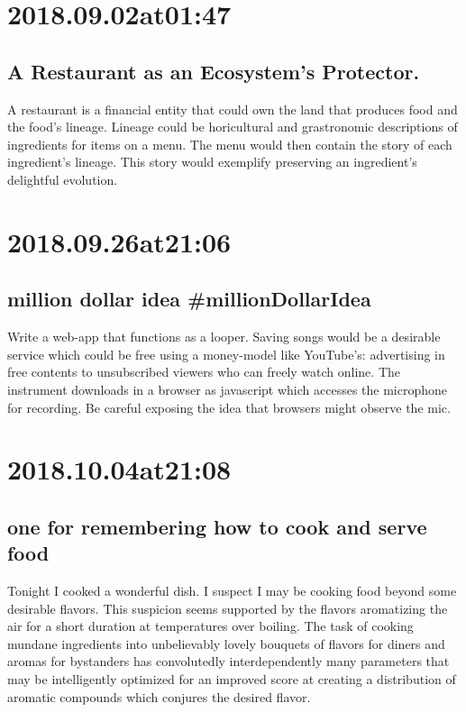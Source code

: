 \section*{ 2018.09.02at01:47 }
\subsection*{ A Restaurant as an Ecosystem's Protector. }
A restaurant is a financial entity that could own the land that produces food and the food's lineage.
Lineage could be horicultural and grastronomic descriptions of ingredients for items on a menu.
The menu would then contain the story of each ingredient's lineage.
This story would exemplify preserving an ingredient's delightful evolution.

\section*{ 2018.09.26at21:06 }
\subsection*{ million dollar idea \#millionDollarIdea}
Write a web-app that functions as a looper. Saving songs would be a desirable service which could be free using a money-model like YouTube's: advertising in free contents to unsubscribed viewers who can freely watch online. The instrument downloads in a browser as javascript which accesses the microphone for recording. Be careful exposing the idea that browsers might observe the mic. 

\section*{ 2018.10.04at21:08 }
\subsection*{ one for remembering how to cook and serve food }
Tonight I cooked a wonderful dish.
I suspect I may be cooking food beyond some desirable flavors.
This suspicion seems supported by the flavors aromatizing the air for a short duration at temperatures over boiling.
The task of cooking mundane ingredients into unbelievably lovely bouquets of flavors for diners and aromas for bystanders has convolutedly interdependently many parameters that may be intelligently optimized for an improved score at creating a distribution of aromatic compounds which conjures the desired flavor.

